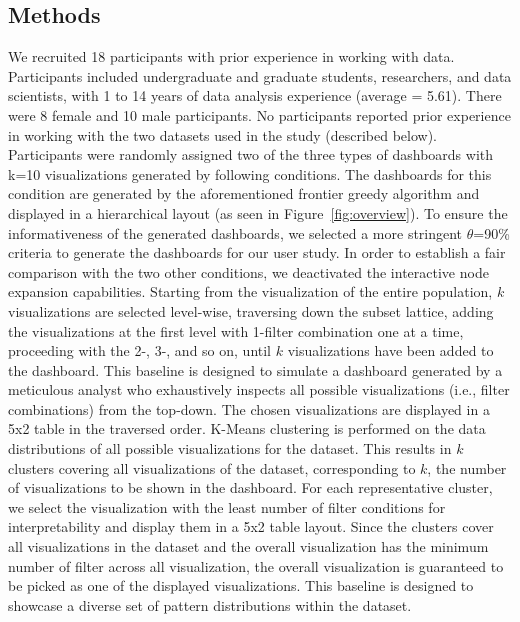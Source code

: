 \subsection{Methods}
We recruited 18 participants with prior experience in working with data. Participants included undergraduate and graduate students, researchers, and data scientists, with 1 to 14 years of data analysis experience (average = 5.61).  %
There were 8 female and 10 male participants. No participants reported prior experience in working with the two datasets used in the study (described below). Participants were randomly assigned two of the three types of dashboards with k=10 visualizations generated by following conditions.
\stitle{\system:} The dashboards for this condition are generated by the aforementioned frontier greedy algorithm and displayed in a hierarchical layout (as seen in Figure~\ref{fig:overview}). To ensure the informativeness of the generated dashboards, we selected a more stringent $\theta$=90\% criteria to generate the dashboards for our user study. In order to establish a fair comparison with the two other conditions, we deactivated  the interactive node expansion capabilities.
 Starting from the visualization of the entire population, $k$ visualizations are selected level-wise, traversing down the subset lattice, adding the visualizations at the first level with 1-filter combination one at a time, proceeding with the 2-, 3-, and so on, until $k$ visualizations have been added to the dashboard. This baseline is designed to simulate a dashboard generated by a meticulous analyst who exhaustively inspects all possible visualizations (i.e., filter combinations) from the top-down. The chosen visualizations are displayed in a 5x2 table in the traversed order.
\stitle{\cluster:} K-Means clustering is performed on the data distributions of all possible visualizations for the dataset. This results in $k$ clusters covering all visualizations of the dataset, corresponding to $k$, the number of visualizations to be shown in the dashboard. For each representative cluster, we select the visualization with the least number of filter conditions for interpretability and display them in a 5x2 table layout. Since the clusters cover all visualizations in the dataset and the overall visualization has the minimum number of filter across all visualization, the overall visualization is guaranteed to be picked as one of the displayed visualizations. This baseline is designed to showcase a diverse set of pattern distributions within the dataset.
